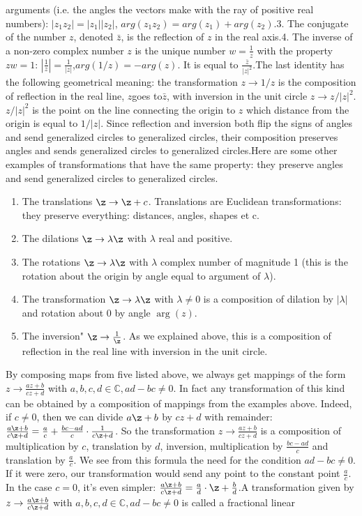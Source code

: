 arguments (i.e. the angles the vectors make with the ray of positive real numbers): $\left|z_1 z_2\right|=\left|z_1\right|\left|z_2\right|$, $arg(z_1 z_2)=arg(z_1)+arg(z_2)$.3. The conjugate of the number $z$, denoted $\bar{z}$, is the reflection of $z$ in the real axis.4. The inverse of a non-zero complex number $z$ is the unique number $w=\frac{1}{z}$ with the property $z w=1$: $\left|\frac{1}{z}\right|=\frac{1}{\left|z\right|}$,$arg(1/z)=-arg(z)$. It is equal to $\frac{\bar{z}}{\left|z\right|^2}$.The last identity has the following geometrical meaning: the transformation $z\rightarrow 1/z$ is the composition of reflection in the real line, $z$goes to$\bar{z}$, with inversion in the unit circle $z\rightarrow z/|z|^2$. $z/|z|^2$ is the point on the line connecting the origin to $z$ which distance from the origin is equal to $1/|z|$. Since reflection and inversion both flip the signs of angles and send generalized circles to generalized circles, their composition preserves angles and sends generalized circles to generalized circles.Here are some other examples of transformations that have the same property: they preserve angles and send generalized circles to generalized circles.\begin{enumerate}\item The translations $\z\rightarrow \z+c$. Translations are Euclidean transformations: they preserve everything: distances, angles, shapes et c.\item The dilations $\z\rightarrow \lambda \z$ with $\lambda$ real and positive.\item The rotations $\z\rightarrow \lambda \z$ with $\lambda$ complex number of magnitude 1 (this is the rotation about the origin by angle equal to argument of $\lambda$).\item The transformation $\z\rightarrow \lambda \z$ with $\lambda\neq 0$ is a composition of dilation by $|\lambda|$ and rotation about $0$ by angle $\arg(z)$.\item The inversion" $\z\rightarrow \frac{1}{\z}$. As we explained above, this is a composition of reflection in the real line with inversion in the unit circle.\end{enumerate}By composing maps from five listed above, we always get mappings of the form $z\rightarrow \frac{a z+b}{c z + d}$ with $a,b,c,d \in \mathbb{C}, a d - b c \neq 0$. In fact any transformation of this kind can be obtained by a composition of mappings from the examples above. Indeed, if $c\neq 0$, then we can divide $a \z+b$ by $cz +d$ with remainder: $\frac{a \z+b}{c \z + d}=\frac{a}{c}+\frac{b c - a d}{c}\cdot\frac{1}{c \z+d}$. So the transformation $z\rightarrow \frac{a z+b}{c z + d}$ is a composition of multiplication by $c$, translation by $d$, inversion, multiplication by $\frac{b c - a d}{c}$ and translation by $\frac{a}{c}$. We see from this formula the need for the condition $a d - b c \neq 0$. If it were zero, our transformation would send any point to the constant point $\frac{a}{c}$. In the case $c=0$, it's even simpler: $\frac{a \z+b}{c \z + d}=\frac{a}{d}\cdot \z + \frac{b}{d}$.A transformation given by $z\rightarrow \frac{a \z+b}{c \z + d}$ with $a,b,c,d \in \mathbb{C}, a d - b c \neq 0$ is called a fractional linear 